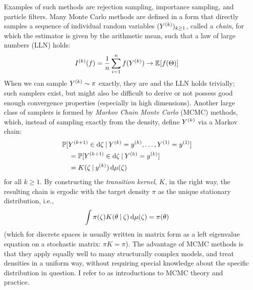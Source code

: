 Examples of such methods are rejection sampling, importance sampling, and particle filters.  Many
Monte Carlo methods are defined in a form that directly samples a sequence of individual random
variables \((Y^{(k)})_{k \ge 1}\), called a \emph{chain}, for which the estimator is given by the
arithmetic mean, such that a law of large numbers (LLN) holds:
\begin{equation}
  \label{eq:mc-lln}
  \kth{I}(f) = \frac{1}{n} \sum_{i=1}^{n} f(\kth{Y}) \to \Exp{f(\Theta)}
\end{equation}
When we can sample \(Y^{(k)} \sim \pi\) exactly, they are \iid{} and the LLN holds trivially; such
samplers exist, but might also be difficult to derive or not possess good enough convergence
properties (especially in high dimensions).  Another large class of samplers is formed by
\emph{Markov Chain Monte Carlo} (MCMC) methods, which, instead of sampling exactly from the density,
define \(Y^{(k)}\) via a Markov chain:
\begin{equation}
  \label{eq:mc-kernel}
  \begin{aligned}
    &\Prob{\kth[k+1]{Y} \in \dif\zeta
      \given \kth{Y} = \kth{y}, \ldots, \kth[1]{Y} = \kth[1]{y}} \\
    &\quad = \Prob{\kth[k+1]{Y} \in \dif\zeta \given \kth{Y} = \kth{y}}  \\
    &\quad = K(\zeta \given \kth{y}) \dif\mu(\zeta)
  \end{aligned}
\end{equation}
for all \(k \ge 1\).  By constructing the \emph{transition kernel}, \(K\), in the right way, the
resulting chain is ergodic with the target density \(\pi\) as the unique stationary distribution,
i.e.,
\begin{equation}
  \label{eq:markov-chain}
  \int \pi(\zeta) K(\theta \given \zeta) \dif\mu(\zeta) = \pi(\theta)
\end{equation}
(which for discrete spaces is usually written in matrix form as a left eigenvalue equation on a
stochastic matrix: \(\pi K = \pi\)).  The advantage of MCMC methods is that they apply equally well
to many structurally complex models, and treat densities in a uniform way, without requiring special
knowledge about the specific distribution in question.  I refer to \textcites[chapter
6]{vihola2020lectures}{robert1999monte}[chapters 24 and following]{murphy2012machine} as
introductions to MCMC theory and practice.

